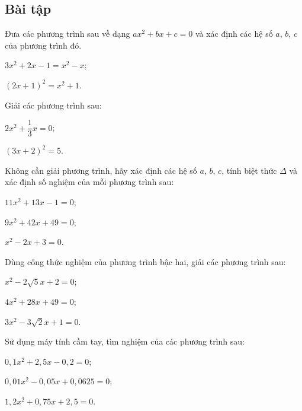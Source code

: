 \begin{exercises}
    \subsection{Bài tập}

    \begin{questions}[resume=SGK]
        \item Đưa các phương trình sau về dạng $ax^2+bx+c=0$ và xác định các hệ số $a$, $b$, $c$ của phương trình đó.
        \begin{questions}
            \item $3x^2+2x-1=x^2-x$;
            \item $(2x+1)^2=x^2+1$.
        \end{questions}
        \answerline
        \answerline

        \item Giải các phương trình sau:
        \begin{questions}
            \item $2x^2+\dfrac{1}{3}x=0$;
            \item $(3x+2)^2=5$.
        \end{questions}
        \answerline
        \answerline

        \item Không cần giải phương trình, hãy xác định các hệ số $a$, $b$, $c$, tính biệt thức $\Delta$ và xác định số nghiệm của mỗi phương trình sau:
        \begin{questions}
            \item $11x^2+13x-1=0$;
            \item $9x^2+42x+49=0$;
            \item $x^2-2x+3=0$.
        \end{questions}
        \answerline
        \answerline

        \item Dùng công thức nghiệm của phương trình bậc hai, giải các phương trình sau:
        \begin{questions}
            \item $x^2-2\sqrt{5}x+2=0$;
            \item $4x^2+28x+49=0$;
            \item $3x^2-3\sqrt{2}x+1=0$.
        \end{questions}
        \answerline
        \answerline

        \item Sử dụng máy tính cầm tay, tìm nghiệm của các phương trình sau:
        \begin{questions}
            \item $0{,}1x^2+2{,}5x-0{,}2=0$;
            \item $0{,}01x^2-0{,}05x+0{,}0625=0$;
            \item $1{,}2x^2+0{,}75x+2{,}5=0$.
        \end{questions}
        \answerline
        \answerline


\end{questions}
\end{exercises}

